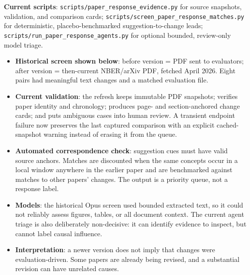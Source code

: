 \documentclass[
  11pt,
  letterpaper,
]{article}
\providecommand{\tightlist}{%
  \setlength{\itemsep}{0pt}\setlength{\parskip}{0pt}}
\begin{document}
\begin{tcolorbox}[enhanced jigsaw, colframe=quarto-callout-note-color-frame, breakable, rightrule=.15mm, toptitle=1mm, opacitybacktitle=0.6, opacityback=0, colback=white, bottomtitle=1mm, leftrule=.75mm, toprule=.15mm, coltitle=black, bottomrule=.15mm, titlerule=0mm, title=\textcolor{quarto-callout-note-color}{\faInfo}\hspace{0.5em}{Pipeline and caveats}, colbacktitle=quarto-callout-note-color!10!white, arc=.35mm, left=2mm]

\textbf{Current scripts}: \texttt{scripts/paper\_response\_evidence.py}
for source snapshots, validation, and comparison cards;
\texttt{scripts/screen\_paper\_response\_matches.py} for deterministic,
placebo-benchmarked suggestion-to-change leads;
\texttt{scripts/run\_paper\_response\_agents.py} for optional bounded,
review-only model triage.

\begin{itemize}
\tightlist
\item
  \textbf{Historical screen shown below}: before version = PDF sent to
  evaluators; after version = then-current NBER/arXiv PDF, fetched April
  2026. Eight pairs had meaningful text changes and a matched evaluation
  file.
\item
  \textbf{Current validation}: the refresh keeps immutable PDF
  snapshots; verifies paper identity and chronology; produces page- and
  section-anchored change cards; and puts ambiguous cases into human
  review. A transient endpoint failure now preserves the last captured
  comparison with an explicit cached-snapshot warning instead of erasing
  it from the queue.
\item
  \textbf{Automated correspondence check}: suggestion cues must have
  valid source anchors. Matches are discounted when the same concepts
  occur in a local window anywhere in the earlier paper and are
  benchmarked against matches to other papers' changes. The output is a
  priority queue, not a response label.
\item
  \textbf{Models}: the historical Opus screen used bounded extracted
  text, so it could not reliably assess figures, tables, or all document
  context. The current agent triage is also deliberately non-decisive:
  it can identify evidence to inspect, but cannot label causal
  influence.
\item
  \textbf{Interpretation}: a newer version does not imply that changes
  were evaluation-driven. Some papers are already being revised, and a
  substantial revision can have unrelated causes.
\end{itemize}

\end{tcolorbox}
\end{document}
